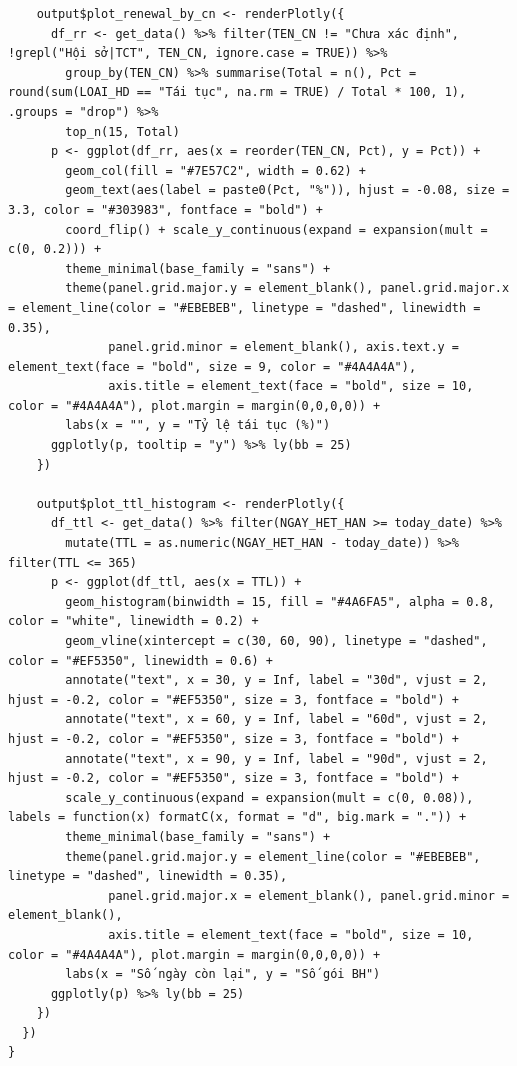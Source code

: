 \documentclass[12pt, a4paper]{article}
\begin{document}
\begin{lstlisting}
    output$plot_renewal_by_cn <- renderPlotly({
      df_rr <- get_data() %>% filter(TEN_CN != "Chưa xác định", !grepl("Hội sở|TCT", TEN_CN, ignore.case = TRUE)) %>%
        group_by(TEN_CN) %>% summarise(Total = n(), Pct = round(sum(LOAI_HD == "Tái tục", na.rm = TRUE) / Total * 100, 1), .groups = "drop") %>%
        top_n(15, Total)
      p <- ggplot(df_rr, aes(x = reorder(TEN_CN, Pct), y = Pct)) +
        geom_col(fill = "#7E57C2", width = 0.62) +
        geom_text(aes(label = paste0(Pct, "%")), hjust = -0.08, size = 3.3, color = "#303983", fontface = "bold") +
        coord_flip() + scale_y_continuous(expand = expansion(mult = c(0, 0.2))) +
        theme_minimal(base_family = "sans") +
        theme(panel.grid.major.y = element_blank(), panel.grid.major.x = element_line(color = "#EBEBEB", linetype = "dashed", linewidth = 0.35),
              panel.grid.minor = element_blank(), axis.text.y = element_text(face = "bold", size = 9, color = "#4A4A4A"),
              axis.title = element_text(face = "bold", size = 10, color = "#4A4A4A"), plot.margin = margin(0,0,0,0)) +
        labs(x = "", y = "Tỷ lệ tái tục (%)")
      ggplotly(p, tooltip = "y") %>% ly(bb = 25)
    })

    output$plot_ttl_histogram <- renderPlotly({
      df_ttl <- get_data() %>% filter(NGAY_HET_HAN >= today_date) %>%
        mutate(TTL = as.numeric(NGAY_HET_HAN - today_date)) %>% filter(TTL <= 365)
      p <- ggplot(df_ttl, aes(x = TTL)) +
        geom_histogram(binwidth = 15, fill = "#4A6FA5", alpha = 0.8, color = "white", linewidth = 0.2) +
        geom_vline(xintercept = c(30, 60, 90), linetype = "dashed", color = "#EF5350", linewidth = 0.6) +
        annotate("text", x = 30, y = Inf, label = "30d", vjust = 2, hjust = -0.2, color = "#EF5350", size = 3, fontface = "bold") +
        annotate("text", x = 60, y = Inf, label = "60d", vjust = 2, hjust = -0.2, color = "#EF5350", size = 3, fontface = "bold") +
        annotate("text", x = 90, y = Inf, label = "90d", vjust = 2, hjust = -0.2, color = "#EF5350", size = 3, fontface = "bold") +
        scale_y_continuous(expand = expansion(mult = c(0, 0.08)), labels = function(x) formatC(x, format = "d", big.mark = ".")) +
        theme_minimal(base_family = "sans") +
        theme(panel.grid.major.y = element_line(color = "#EBEBEB", linetype = "dashed", linewidth = 0.35),
              panel.grid.major.x = element_blank(), panel.grid.minor = element_blank(),
              axis.title = element_text(face = "bold", size = 10, color = "#4A4A4A"), plot.margin = margin(0,0,0,0)) +
        labs(x = "Số ngày còn lại", y = "Số gói BH")
      ggplotly(p) %>% ly(bb = 25)
    })
  })
}
\end{lstlisting}
\newpage
\end{document}
